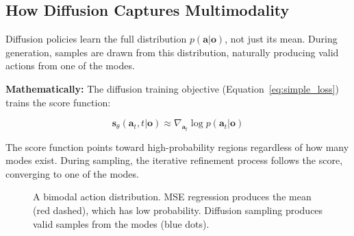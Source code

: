 \subsection{How Diffusion Captures Multimodality}
\label{subsec:diffusion_multimodality}

Diffusion policies learn the full distribution $p(\mathbf{a} | \mathbf{o})$, not just its mean. During generation, samples are drawn from this distribution, naturally producing valid actions from one of the modes.

\textbf{Mathematically:} The diffusion training objective (Equation~\ref{eq:simple_loss}) trains the score function:

\begin{equation}
\mathbf{s}_\theta(\mathbf{a}_t, t | \mathbf{o}) \approx \nabla_{\mathbf{a}_t} \log p(\mathbf{a}_t | \mathbf{o})
\label{eq:conditional_score}
\end{equation}

The score function points toward high-probability regions regardless of how many modes exist. During sampling, the iterative refinement process follows the score, converging to one of the modes.

\begin{figure}[htbp]
\centering
{}
\caption{A bimodal action distribution. MSE regression produces the mean (red dashed), which has low probability. Diffusion sampling produces valid samples from the modes (blue dots).}
\label{fig:multimodal_distribution}
\end{figure}

